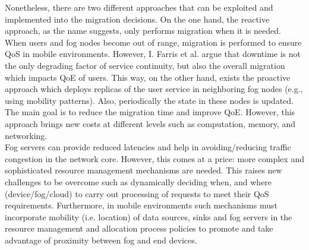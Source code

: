 \noindent\tab Nonetheless, there are two different approaches that can be exploited and implemented into the migration decisions. On the one hand, the reactive approach, as the name suggests, only performs migration when it is needed. When users and fog nodes become out of range, migration is performed to ensure QoS in mobile environments. However, I. Farris et al. \cite{farris2017optimizing} argue that downtime is not the only degrading factor of service continuity, but also the overall migration which impacts QoE of users. This way, on the other hand, exists the proactive approach which deploys replicas of the user service in neighboring fog nodes (e.g., using mobility patterns). Also, periodically the state in these nodes is updated. The main goal is to reduce the migration time and improve QoE. However, this approach brings new costs at different levels such as computation, memory, and networking.\\
\noindent\tab Fog servers can provide reduced latencies and help in avoiding/reducing traffic congestion in the network core. However, this comes at a price: more complex and sophisticated resource management mechanisms are needed. This raises new challenges to be overcome such as dynamically deciding when, and where (device/fog/cloud) to carry out processing of requests to meet their QoS requirements. Furthermore, in mobile environments such mechanisms must incorporate mobility (i.e. location) of data sources, sinks and fog servers in the resource management and allocation process policies to promote and take advantage of proximity between fog and end devices.